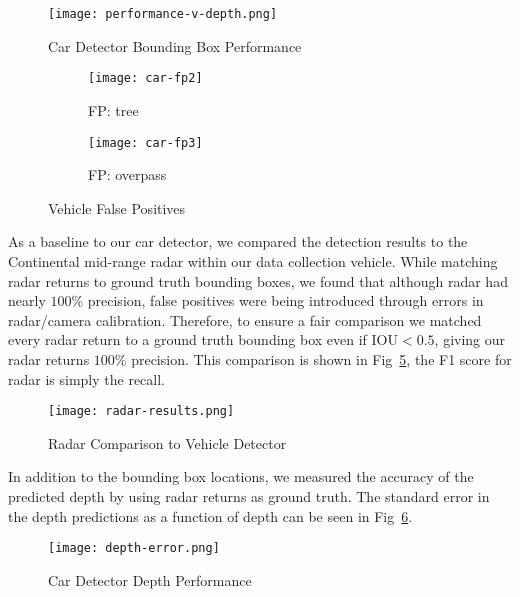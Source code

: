 \documentclass[journal]{IEEEtran}
\begin{document}
\begin{figure}[tb]
  \centering
    \texttt{[image: performance-v-depth.png]}
 \caption{Car Detector Bounding Box Performance}
 \label{fig:car-bb-error}
\end{figure}


\begin{figure}[tb]
        \centering
        \begin{subfigure}[b]{1.7in}%
                \texttt{[image: car-fp2]}
                \caption{FP: tree}
                \label{fig:car-tree}
        \end{subfigure}%
        \begin{subfigure}[b]{1.7in}
                \texttt{[image: car-fp3]}
                \caption{FP: overpass}
                \label{fig:car-overpass}
        \end{subfigure}
        \caption{Vehicle False Positives}\label{fig:car-fp}
\end{figure}

As a baseline to our car detector, we compared the detection results to the Continental mid-range radar within our data collection vehicle. While matching radar returns to ground truth bounding boxes, we found that although radar had nearly $100\%$ precision, false positives were being introduced through errors in radar/camera calibration. Therefore, to ensure a fair comparison we matched every radar return to a ground truth bounding box even if IOU$<0.5$, giving our radar returns $100\%$ precision. This comparison is shown in Fig~\ref{fig:nn-v-radar}, the F1 score for radar is simply the recall.

\begin{figure}[tb]
  \centering
    \texttt{[image: radar-results.png]}
 \caption{Radar Comparison to Vehicle Detector}
 \label{fig:nn-v-radar}
\end{figure}


In addition to the bounding box locations, we measured the accuracy of the predicted depth by using radar returns as ground truth. The standard error in the depth predictions as a function of depth can be seen in Fig~\ref{fig:car-depth-error}.

\begin{figure}[tb]
  \centering
    \texttt{[image: depth-error.png]}
 \caption{Car Detector Depth Performance}
 \label{fig:car-depth-error}
\end{figure}
\end{document}
